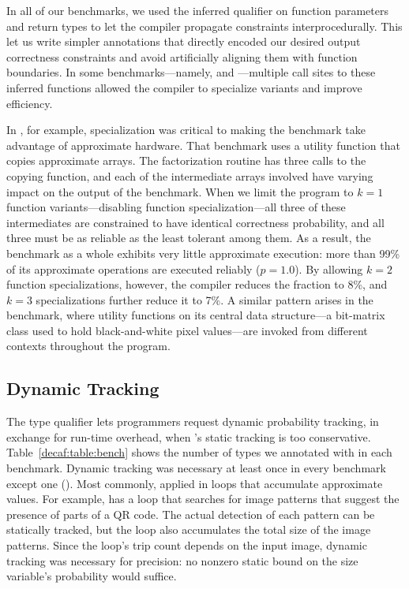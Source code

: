 {In all of our benchmarks, we used the inferred  qualifier on
function parameters and return types to let the compiler propagate constraints
interprocedurally.
This let us write simpler annotations that directly encoded our desired output
correctness constraints and avoid artificially aligning them with function
boundaries.
In some benchmarks---namely,  and ---multiple call
sites to these inferred functions allowed the compiler to specialize variants
and improve efficiency.

In , for example, specialization was critical to making the
benchmark take advantage of approximate hardware.
That benchmark uses a utility function that copies approximate arrays.
The factorization routine has three calls to the copying function, and each of
the intermediate arrays involved have varying impact on the output of the
benchmark.
When we limit the program to $k=1$ function variants---disabling function
specialization---all three of these intermediates are constrained to
have identical correctness probability, and all three must be as reliable as
the least tolerant among them.
As a result, the benchmark as a whole exhibits very little approximate
execution: more than 99\% of its approximate operations are executed reliably
($p = 1.0$).
By allowing $k=2$ function specializations, however, the compiler reduces the
fraction to 8\%, and $k=3$ specializations further reduce it to 7\%.
A similar pattern arises in the  benchmark, where utility functions
on its central data structure---a bit-matrix class used to hold
black-and-white pixel values---are invoked from different contexts
throughout the program.


\subsection{Dynamic Tracking}

The  type qualifier lets programmers request dynamic
probability tracking, in exchange for run-time overhead, when \lang's static
tracking is too conservative.
Table~\ref{decaf:table:bench} shows the number of types we annotated with
 in each benchmark.
Dynamic tracking was necessary at least once in every benchmark except one
().
Most commonly,  applied in loops that accumulate approximate
values.
For example,  has a loop that searches for image patterns that
suggest the presence of parts of a QR code.
The actual detection of each pattern can be statically tracked, but the loop
also accumulates the total size of the image patterns.
Since the loop's trip count depends on the input image, dynamic tracking was
necessary for precision:
no nonzero static bound on the size variable's probability would suffice.

}
